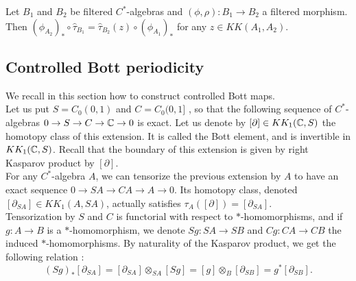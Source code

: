 \begin{prop}
Let $B_1$ and $B_2$ be filtered $C^*$-algebras and $(\phi,\rho) :B_1\rightarrow B_2 $ a filtered morphism. Then $ (\phi_{A_2})_*\circ \hat \tau_{B_1}=\hat \tau_{B_2}(z)\circ(\phi_{A_1})_* $ for any $z\in KK(A_1,A_2)$.
\end{prop}

\subsection{Controlled Bott periodicity}

We recall in this section how to construct controlled Bott maps.\\

Let us put $S = C_0(0,1)$ and $C= C_0(0,1]$ , so that the following sequence of $C^*$-algebras $0\rightarrow S \rightarrow C \rightarrow \mathbb C \rightarrow  0 $ is exact. Let us denote by $[\partial]\in KK_1(\mathbb C,S)$ the homotopy class of this extension. It is called the Bott element, and is invertible in $KK_1(\mathbb C,S)$. Recall that the boundary of this extension is given by right Kasparov product by $[\partial]$.\\ 

For any $C^*$-algebra $A$, we can tensorize the previous extension by $A$ to have an exact sequence $0\rightarrow SA \rightarrow CA \rightarrow A \rightarrow  0 $. Its homotopy class, denoted $[\partial_{SA}]\in KK_1(A,SA)$, actually satisfies $\tau_A([\partial ]) =[\partial_{SA}]$.\\

Tensorization by $S$ and $C$ is functorial with respect to $*$-homomorphisms, and if $g : A\rightarrow B$ is a $*$-homomorphism, we denote $Sg : SA\rightarrow SB$ and $Cg : CA\rightarrow CB$ the induced $*$-homomorphisms. By naturality of the Kasparov product, we get the following relation :
\[(Sg)_*[\partial_{SA}] = [\partial_{SA}]\otimes_{SA} [Sg] = [g]\otimes_{B} [\partial_{SB}] = g^*[\partial_{SB}] .\]















 

